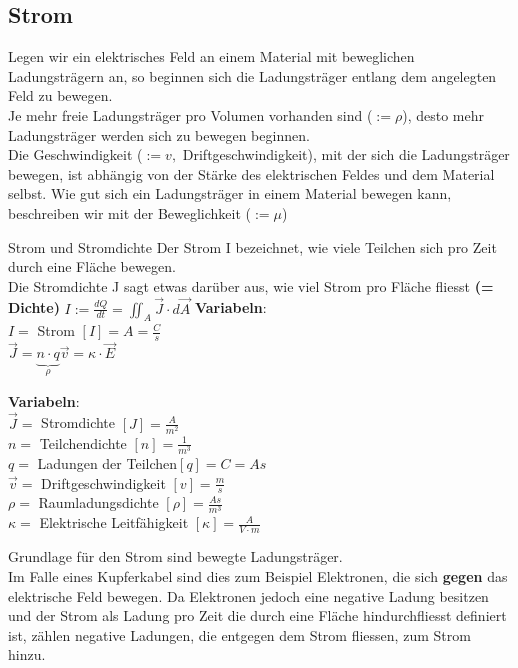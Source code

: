 
					\subsection{Strom}
					\label{chap:Style}
					Legen wir ein elektrisches Feld an einem Material mit beweglichen Ladungsträgern an,
					so beginnen sich die Ladungsträger entlang dem angelegten Feld zu bewegen. \\
					Je mehr freie Ladungsträger pro Volumen vorhanden sind ($:= \rho$), desto mehr Ladungsträger werden sich zu bewegen beginnen. \\
					Die Geschwindigkeit ($:= v,$ Driftgeschwindigkeit), mit der sich die Ladungsträger bewegen, ist abhängig von der Stärke des elektrischen Feldes und
					dem Material selbst. Wie gut sich ein Ladungsträger in einem Material bewegen kann, beschreiben wir mit der Beweglichkeit ($:= \mu$)


					 {Strom und Stromdichte}
					\beginip
					Der Strom I bezeichnet, wie viele Teilchen sich pro Zeit durch eine Fläche bewegen. \\
					Die Stromdichte J sagt etwas darüber aus, wie viel Strom pro Fläche fliesst \textbf{(= Dichte)}
					\formulaBegin
						$\displaystyle I := \frac{dQ}{dt} = \iint_A \vec{J} \cdot d\vec{A}$
					\formulaEnd
					\textbf{Variabeln}: \\
					$ I = $ Strom $ [I] = A = \frac{C}{s}$ \\

					\formulaBegin
					$\displaystyle \vec{J} = \underbrace{n\cdot q}_{\rho} \vec{v} = \kappa \cdot \vec{E}$
					\formulaEnd

					\textbf{Variabeln}: \\
					$ \vec{J} = $ Stromdichte $ [J] = \frac{A}{m^2}$ \\
					$ n =$ Teilchendichte $ [n] = \frac{1}{m^3}$ \\
					$ q =$ Ladungen der Teilchen$ [q] = C = As$ \\
					$ \vec{v} = $ Driftgeschwindigkeit $ [v] = \frac{m}{s}$ \\
					$ \rho = $ Raumladungsdichte $ [\rho] = \frac{As}{m^3}$ \\
					$ \kappa = $ Elektrische Leitfähigkeit $ [\kappa] = \frac{A}{V\cdot m}$
					\iend

					Grundlage für den Strom sind bewegte Ladungsträger. \\
					Im Falle eines Kupferkabel sind dies zum Beispiel Elektronen, die sich \textbf{gegen} das
					elektrische Feld bewegen. Da Elektronen jedoch eine negative Ladung besitzen und der Strom als Ladung pro Zeit die durch eine Fläche hindurchfliesst definiert ist, zählen negative Ladungen, die entgegen dem Strom fliessen, zum Strom hinzu.

